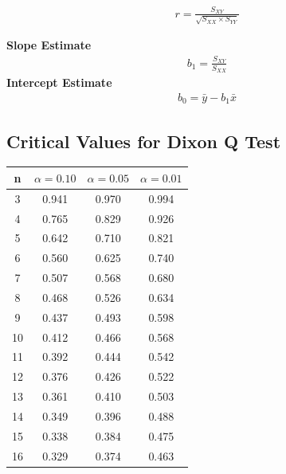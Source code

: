 \documentclass[a4paper,12pt]{article}
\begin{document}
\begin{eqnarray*}
	r = \frac{S_{XY}}{\sqrt{S_{XX} \times S_{YY}}}
\end{eqnarray*}

{\bf Slope Estimate}
\begin{eqnarray*}
	b_1 = \frac{S_{XY}}{S_{XX}}
\end{eqnarray*}
{\bf Intercept Estimate}
\begin{eqnarray*}
	b_0 = \bar{y} -b_1\bar{x}
\end{eqnarray*}

%

\subsection*{Critical Values for Dixon Q Test}
{
	\Large
	\begin{center}
		\begin{tabular}{|c|c|c|c|}
			\hline  n  & $\alpha=0.10$  & $\alpha=0.05$  & $\alpha=0.01$  \\ \hline
			3  & 0.941 & 0.970 & 0.994 \\ \hline
			4  & 0.765 & 0.829 & 0.926 \\ \hline
			5  & 0.642 & 0.710 & 0.821 \\ \hline
			6  & 0.560 & 0.625 & 0.740  \\ \hline
			7  & 0.507 & 0.568 & 0.680  \\ \hline
			8  & 0.468 & 0.526 & 0.634 \\ \hline
			9  & 0.437 & 0.493 & 0.598 \\ \hline
			10 & 0.412 & 0.466 & 0.568 \\ \hline
			11 & 0.392 & 0.444 & 0.542 \\ \hline
			12 & 0.376 & 0.426 & 0.522 \\ \hline
			13 & 0.361 & 0.410 & 0.503 \\ \hline
			14 & 0.349 & 0.396 & 0.488 \\ \hline
			15 & 0.338 & 0.384 & 0.475 \\ \hline
			16 & 0.329 & 0.374 & 0.463 \\ \hline
		\end{tabular} 
	\end{center}
}
\end{document}
